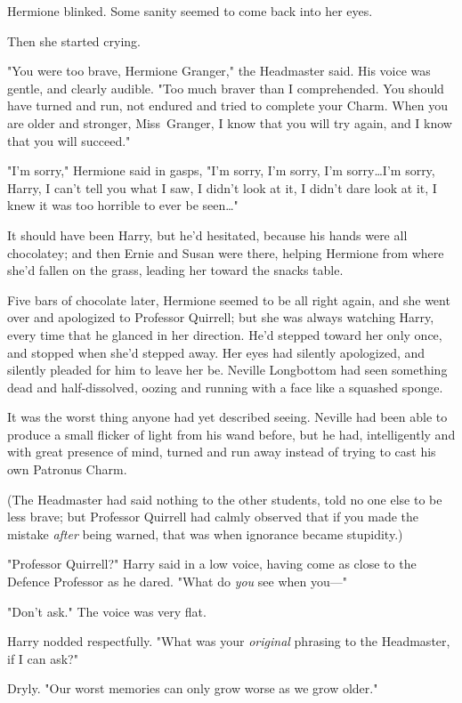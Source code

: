 Hermione blinked. Some sanity seemed to come back into her eyes.

Then she started crying.

"You were too brave, Hermione Granger," the Headmaster said. His voice was
gentle, and clearly audible. "Too much braver than I comprehended. You should
have turned and run, not endured and tried to complete your Charm. When you are
older and stronger, Miss~Granger, I know that you will try again, and I know
that you will succeed."

"I'm sorry," Hermione said in gasps, "I'm sorry, I'm sorry, I'm sorry…I'm
sorry, Harry, I can't tell you what I saw, I didn't look at it, I didn't
dare look at it, I knew it was too horrible to ever be seen…"

It should have been Harry, but he'd hesitated, because his hands were all
chocolatey; and then Ernie and Susan were there, helping Hermione from where
she'd fallen on the grass, leading her toward the snacks table.

Five bars of chocolate later, Hermione seemed to be all right again, and she
went over and apologized to Professor Quirrell; but she was always watching
Harry, every time that he glanced in her direction. He'd stepped toward her
only once, and stopped when she'd stepped away. Her eyes had silently
apologized, and silently pleaded for him to leave her be.
\later
Neville Longbottom had seen something dead and half-dissolved, oozing and
running with a face like a squashed sponge.

It was the worst thing anyone had yet described seeing. Neville had been able
to produce a small flicker of light from his wand before, but he had,
intelligently and with great presence of mind, turned and run away instead of
trying to cast his own Patronus Charm.

(The Headmaster had said nothing to the other students, told no one else to be
less brave; but Professor Quirrell had calmly observed that if you made the
mistake \emph{after} being warned, that was when ignorance became stupidity.)

"Professor Quirrell?" Harry said in a low voice, having come as close to the
Defence Professor as he dared. "What do \emph{you} see when you—"

"Don't ask." The voice was very flat.

Harry nodded respectfully. "What was your \emph{original} phrasing to the
Headmaster, if I can ask?"

Dryly. "Our worst memories can only grow worse as we grow older."

